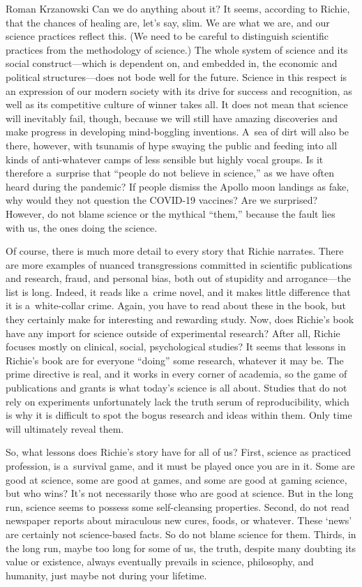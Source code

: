 \begin{newrevengenv}{Roman Krzanowski}
Can we do anything about it? It seems, according to Richie, that the chances of healing are, let's say, slim. We are what we are, and our science practices reflect this. (We need to be careful to distinguish scientific practices from the methodology of science.) The whole system of science and its social construct—which is dependent on, and embedded in, the economic and political structures—does not bode well for the future. Science in this respect is an expression of our modern society with its drive for success and recognition, as well as its competitive culture of winner takes all. It does not mean that science will inevitably fail, though, because we will still have amazing discoveries and make progress in developing mind-boggling inventions. A~sea of dirt will also be there, however, with tsunamis of hype swaying the public and feeding into all kinds of anti-whatever camps of less sensible but highly vocal groups. Is it therefore a~surprise that ``people do not believe in science,'' as we have often heard during the pandemic? If people dismiss the Apollo moon landings as fake, why would they not question the COVID-19 vaccines? Are we surprised? However, do not blame science or the mythical ``them,'' because the fault lies with us, the ones doing the science.

Of course, there is much more detail to every story that Richie narrates. There are more examples of nuanced transgressions committed in scientific publications and research, fraud, and personal bias, both out of stupidity and arrogance—the list is long. Indeed, it reads like a~crime novel, and it makes little difference that it is a~white-collar crime. Again, you have to read about these in the book, but they certainly make for interesting and rewarding study. Now, does Richie's book have any import for science outside of experimental research? After all, Richie focuses mostly on clinical, social, psychological studies? It seems that lessons in Richie's book are for everyone ``doing'' some research, whatever it may be. The prime directive is real, and it works in every corner of academia, so the game of publications and grants is what today's science is all about. Studies that do not rely on experiments unfortunately lack the truth serum of reproducibility, which is why it is difficult to spot the bogus research and ideas within them. Only time will ultimately reveal them.

So, what lessons does Richie's story have for all of us? First, science as practiced profession, is a~survival game, and it must be played once you are in it. Some are good at science, some are good at games, and some are good at gaming science, but who wins? It's not necessarily those who are good at science. But in the long run, science seems to possess some self-cleansing properties. Second, do not read newspaper reports about miraculous new cures, foods, or whatever. These ‘news' are certainly not science-based facts. So do not blame science for them. Thirds, in the long run, maybe too long for some of us, the truth, despite many doubting its value or existence, always eventually prevails in science, philosophy, and humanity, just maybe not during your lifetime.


\end{newrevengenv}
